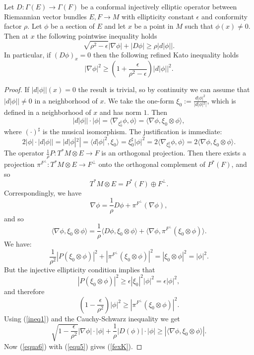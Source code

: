 \documentclass[10pt,a4paper]{amsart}
\newcommand{\ra}{\rightarrow}
\begin{document}
\begin{theorem}\label{Dinjelliptic} Let $D:\Gamma(E)\ra\Gamma(F)$ be a conformal injectively elliptic operator  between Riemannian vector bundles $E,F \ra M$ with ellipticity constant $\epsilon$ and conformity factor $\rho$. Let $\phi$ be a section of $E$ and let $x$ be a point in $M$ such that $\phi(x)\neq0$. Then at $x$ the following pointwise inequality holds
\begin{equation}\label{fexK} \sqrt{\rho^ 2- \epsilon}|\nabla \phi|+ |D \phi|\geq  \rho|d|\phi||.
\end{equation}
In particular, if $(D\phi)_x=0$ then the following refined Kato inequality holds
\[|\nabla \phi|^ 2\geq \left(1+\frac{\epsilon}{\rho^2-\epsilon}\right)|d|\phi||^ 2. \]
\end{theorem}

\begin{proof}
If $|d|\phi||(x) = 0$ the result is trivial, so by continuity we can assume that $|d|\phi|| \ne 0$ in a neighborhood of $x$. We take the one-form $\xi_0:=\frac{d|\phi|^2}{|d|\phi|^2|}$, which is defined in a neighborhood of $x$ and has norm $1$. Then
\begin{equation}\label{equ5} |d|\phi||\cdot|\phi|=\langle \nabla_{\xi_0^{\sharp}}\phi,\phi\rangle=\langle \nabla \phi,\xi_0\otimes \phi \rangle ,
\end{equation}
where $(\cdot)^{\sharp}$ is the musical isomorphism. The justification is immediate:
\begin{equation}\label{mine} 2|\phi|\cdot|d|\phi||=|d|\phi|^2|=\langle d|\phi|^2,\xi_0\rangle=\xi_0^{\sharp}|\phi|^2=2\langle \nabla_{\xi_0^{\sharp}}\phi,\phi \rangle=2\langle \nabla \phi,\xi_0\otimes \phi \rangle.
\end{equation}
The operator $\frac{1}{\rho}P:T^ *M\otimes E\ra F$ is an orthogonal projection. Then there exists a projection $\pi^{F^ {\perp}}:T^ *M\otimes E\ra F^ {\perp}$ onto the orthogonal complement of $P^ *(F)$, and so
\[T^ *M\otimes E=P^ *(F)\oplus F^ {\perp}.\]
Correspondingly, we have \[\nabla \phi=\frac{1}{\rho}D\phi + \pi^{F^{\perp}} (\nabla \phi),\]
and so 
\begin{equation}\label{ineq1}\langle \nabla \phi,\xi_0\otimes \phi \rangle=\frac{1}{\rho}\langle D \phi ,\xi_0\otimes \phi\rangle+\langle \nabla \phi,\pi^{F^ {\perp}}(\xi_0\otimes \phi)\rangle.\end{equation}
We have:
\[\frac{1}{\rho^ 2}|P(\xi_0\otimes \phi)|^ 2+|\pi^ {F^ {\perp}}(\xi_0\otimes \phi)|^ 2=|\xi_0\otimes \phi|^ 2=|\phi|^ 2.\]
But the injective ellipticity condition implies that
\[|P(\xi_0\otimes \phi)|^ 2\geq \epsilon |\xi_0|^ 2|\phi|^ 2=\epsilon|\phi|^2, \]
and therefore
\[ \left(1-\frac{\epsilon}{\rho^ 2}\right)|\phi|^2 \geq |\pi^ {F^ {\perp}}(\xi_0\otimes \phi)|^2.\]
Using (\ref{ineq1}) and the Cauchy-Schwarz inequality we get
\begin{equation}\label{equa6}  \sqrt{1-\frac{\epsilon}{\rho^ 2}}|\nabla \phi|\cdot|\phi|+\frac{1}{\rho}|D(\phi)|\cdot|\phi|\geq |\langle \nabla \phi,\xi_0\otimes \phi \rangle|.\end{equation}
Now (\ref{equa6}) with (\ref{equ5}) gives (\ref{fexK}).
\end{proof}
\end{document}

